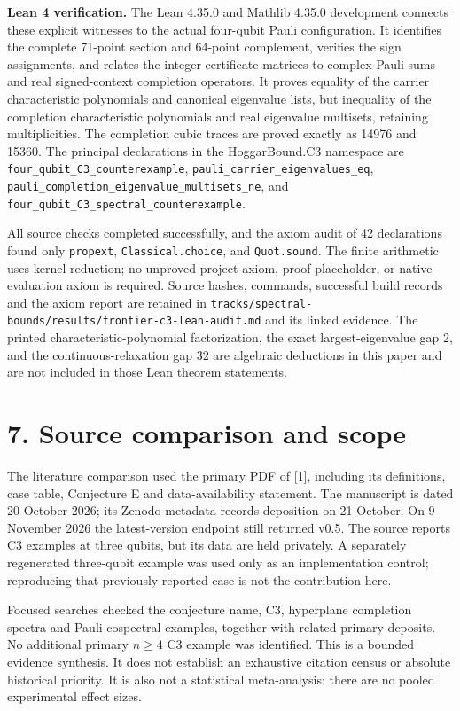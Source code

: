 \documentclass[11pt,letterpaper]{article}
\begin{document}
\textbf{Lean 4 verification.} The Lean 4.35.0 and Mathlib 4.35.0 development connects these explicit witnesses to the actual four-qubit Pauli configuration. It identifies the complete 71-point section and 64-point complement, verifies the sign assignments, and relates the integer certificate matrices to complex Pauli sums and real signed-context completion operators. It proves equality of the carrier characteristic polynomials and canonical eigenvalue lists, but inequality of the completion characteristic polynomials and real eigenvalue multisets, retaining multiplicities. The completion cubic traces are proved exactly as 14976 and 15360. The principal declarations in the HoggarBound.C3 namespace are \texttt{four\_qubit\_C3\_counterexample}, \texttt{pauli\_carrier\_eigenvalues\_eq}, \texttt{pauli\_completion\_eigenvalue\_multisets\_ne}, and \texttt{four\_qubit\_C3\_spectral\_counterexample}.

All source checks completed successfully, and the axiom audit of 42 declarations found only \texttt{propext}, \texttt{Classical.choice}, and \texttt{Quot.sound}. The finite arithmetic uses kernel reduction; no unproved project axiom, proof placeholder, or native-evaluation axiom is required. Source hashes, commands, successful build records and the axiom report are retained in \nolinkurl{tracks/spectral-bounds/results/frontier-c3-lean-audit.md} and its linked evidence. The printed characteristic-polynomial factorization, the exact largest-eigenvalue gap 2, and the continuous-relaxation gap 32 are algebraic deductions in this paper and are not included in those Lean theorem statements.

\section{7. Source comparison and scope}\label{source-comparison-and-scope}

The literature comparison used the primary PDF of {[}1{]}, including its definitions, case table, Conjecture E and data-availability statement. The manuscript is dated 20 October 2026; its Zenodo metadata records deposition on 21 October. On 9 November 2026 the latest-version endpoint still returned v0.5. The source reports C3 examples at three qubits, but its data are held privately. A separately regenerated three-qubit example was used only as an implementation control; reproducing that previously reported case is not the contribution here.

Focused searches checked the conjecture name, C3, hyperplane completion spectra and Pauli cospectral examples, together with related primary deposits. No additional primary \(n\ge4\) C3 example was identified. This is a bounded evidence synthesis. It does not establish an exhaustive citation census or absolute historical priority. It is also not a statistical meta-analysis: there are no pooled experimental effect sizes.
\end{document}
